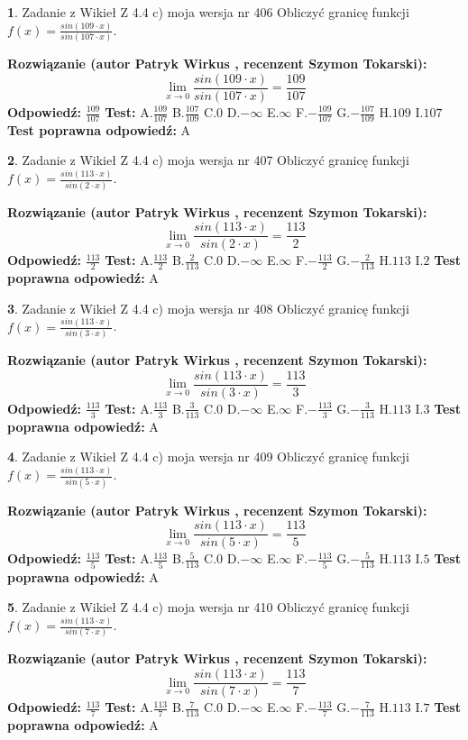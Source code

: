 \documentclass[12pt, a4paper]{article}
\theoremstyle{definition} %
\newtheorem{zad}{}
\newcommand{\zadStart}[1]{\begin{zad}#1\newline}
\newcommand{\zadStop}{\end{zad}}
\newcommand{\rozwStart}[2]{\noindent \textbf{Rozwiązanie (autor #1 , recenzent #2): }\newline}
\newcommand{\rozwStop}{\newline}
\newcommand{\odpStart}{\noindent \textbf{Odpowiedź:}\newline}
\newcommand{\odpStop}{\newline}
\newcommand{\testStart}{\noindent \textbf{Test:}\newline}
\newcommand{\testStop}{\newline}
\newcommand{\kluczStart}{\noindent \textbf{Test poprawna odpowiedź:}\newline}
\newcommand{\kluczStop}{\newline}
\begin{document}
\zadStart{Zadanie z Wikieł Z 4.4 c) moja wersja nr 406}
Obliczyć granicę funkcji $f(x)=\frac{sin(109\cdot x)}{sin(107\cdot x)}$.
\zadStop
\rozwStart{Patryk Wirkus}{Szymon Tokarski}
$$\lim\limits_{x\to 0}\frac{sin(109\cdot x)}{sin(107\cdot x)}=
\frac{109}{107}$$
\rozwStop
\odpStart
$\frac{109}{107}$
\odpStop
\testStart
A.$\frac{109}{107}$
B.$\frac{107}{109}$
C.$0$
D.$-\infty$
E.$\infty$
F.$-\frac{109}{107}$
G.$-\frac{107}{109}$
H.$109$
I.$107$
\testStop
\kluczStart
A
\kluczStop



\zadStart{Zadanie z Wikieł Z 4.4 c) moja wersja nr 407}
Obliczyć granicę funkcji $f(x)=\frac{sin(113\cdot x)}{sin(2\cdot x)}$.
\zadStop
\rozwStart{Patryk Wirkus}{Szymon Tokarski}
$$\lim\limits_{x\to 0}\frac{sin(113\cdot x)}{sin(2\cdot x)}=
\frac{113}{2}$$
\rozwStop
\odpStart
$\frac{113}{2}$
\odpStop
\testStart
A.$\frac{113}{2}$
B.$\frac{2}{113}$
C.$0$
D.$-\infty$
E.$\infty$
F.$-\frac{113}{2}$
G.$-\frac{2}{113}$
H.$113$
I.$2$
\testStop
\kluczStart
A
\kluczStop



\zadStart{Zadanie z Wikieł Z 4.4 c) moja wersja nr 408}
Obliczyć granicę funkcji $f(x)=\frac{sin(113\cdot x)}{sin(3\cdot x)}$.
\zadStop
\rozwStart{Patryk Wirkus}{Szymon Tokarski}
$$\lim\limits_{x\to 0}\frac{sin(113\cdot x)}{sin(3\cdot x)}=
\frac{113}{3}$$
\rozwStop
\odpStart
$\frac{113}{3}$
\odpStop
\testStart
A.$\frac{113}{3}$
B.$\frac{3}{113}$
C.$0$
D.$-\infty$
E.$\infty$
F.$-\frac{113}{3}$
G.$-\frac{3}{113}$
H.$113$
I.$3$
\testStop
\kluczStart
A
\kluczStop



\zadStart{Zadanie z Wikieł Z 4.4 c) moja wersja nr 409}
Obliczyć granicę funkcji $f(x)=\frac{sin(113\cdot x)}{sin(5\cdot x)}$.
\zadStop
\rozwStart{Patryk Wirkus}{Szymon Tokarski}
$$\lim\limits_{x\to 0}\frac{sin(113\cdot x)}{sin(5\cdot x)}=
\frac{113}{5}$$
\rozwStop
\odpStart
$\frac{113}{5}$
\odpStop
\testStart
A.$\frac{113}{5}$
B.$\frac{5}{113}$
C.$0$
D.$-\infty$
E.$\infty$
F.$-\frac{113}{5}$
G.$-\frac{5}{113}$
H.$113$
I.$5$
\testStop
\kluczStart
A
\kluczStop



\zadStart{Zadanie z Wikieł Z 4.4 c) moja wersja nr 410}
Obliczyć granicę funkcji $f(x)=\frac{sin(113\cdot x)}{sin(7\cdot x)}$.
\zadStop
\rozwStart{Patryk Wirkus}{Szymon Tokarski}
$$\lim\limits_{x\to 0}\frac{sin(113\cdot x)}{sin(7\cdot x)}=
\frac{113}{7}$$
\rozwStop
\odpStart
$\frac{113}{7}$
\odpStop
\testStart
A.$\frac{113}{7}$
B.$\frac{7}{113}$
C.$0$
D.$-\infty$
E.$\infty$
F.$-\frac{113}{7}$
G.$-\frac{7}{113}$
H.$113$
I.$7$
\testStop
\kluczStart
A
\kluczStop
\end{document}
